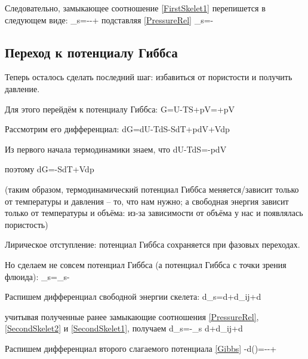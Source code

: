 \documentclass[main.tex]{subfiles}
\begin{document}
Следовательно, замыкающее соотношение \eqref{FirstSkelet1} перепишется в следующем виде:
\beq
\eta_s=--\frac{\partial\varphi}{\partial\theta}+\frac{\partial\varphi}{\partial\theta}
\eeq
подставляя \eqref{PressureRel}
\beq\label{SecondSkelet1}
\eta_s=-
\eeq

\subsection{Переход к потенциалу Гиббса}

Теперь осталось сделать последний шаг: избавиться от пористости и получить давление.

Для этого перейдём к потенциалу Гиббса:
\beq
G=U-TS+pV=\Psi+pV
\eeq

Рассмотрим его дифференциал:
\beq
dG=dU-TdS-SdT+pdV+Vdp
\eeq

Из первого начала термодинамики знаем, что
\beq
dU-TdS=-pdV
\eeq

поэтому
\beq
dG=-SdT+Vdp
\eeq

(таким образом, термодинамический потенциал Гиббса меняется/зависит только от температуры и давления -- то, что нам нужно; а свободная энергия зависит только от температуры и объёма: из-за зависимости от объёма у нас и появлялась пористость)

Лирическое отступление: потенциал Гиббса сохраняется при фазовых переходах.

Но сделаем не совсем потенциал Гиббса (а потенциал Гиббса с точки зрения флюида):
\beq\label{Gibbs}
\Phi_s=\tilde{\Psi}_s-
\eeq

Распишем дифференциал свободной энергии скелета:
\beq
d\tilde{\Psi}_s=d\theta+d\varepsilon_{ij}+d\varphi
\eeq

учитывая полученные ранее замыкающие соотношения \eqref{PressureRel}, \eqref{SecondSkelet2} и \eqref{SecondSkelet1}, получаем
\beq
d\tilde{\Psi}_s=-\eta_s d\theta+d\varepsilon_{ij}+d\varphi
\eeq

Распишем дифференциал второго слагаемого потенциала \eqref{Gibbs}
\beq
-d\left(\right)=--+
\eeq
\end{document}
